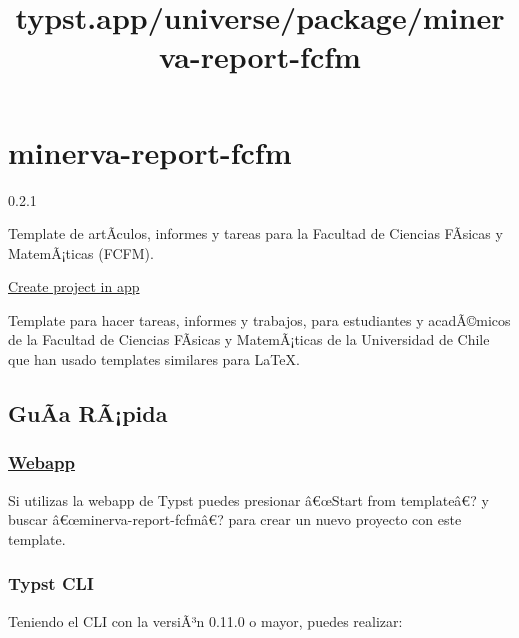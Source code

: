 \title{typst.app/universe/package/minerva-report-fcfm}

\label{banner}
\label{template-thumbnail}

\section{minerva-report-fcfm}\label{minerva-report-fcfm}

{ 0.2.1 }

Template de artÃ­culos, informes y tareas para la Facultad de Ciencias
FÃ­sicas y MatemÃ¡ticas (FCFM).

\href{/app?template=minerva-report-fcfm&version=0.2.1}{Create project in
app}

\label{readme}
Template para hacer tareas, informes y trabajos, para estudiantes y
acadÃ©micos de la Facultad de Ciencias FÃ­sicas y MatemÃ¡ticas de la
Universidad de Chile que han usado templates similares para LaTeX.

\subsection{GuÃ­a RÃ¡pida}\label{guuxe3a-ruxe3pida}

\subsubsection{\texorpdfstring{\href{https://typst.app/}{Webapp}}{Webapp}}\label{webapp}

Si utilizas la webapp de Typst puedes presionar â€œStart from
templateâ€? y buscar â€œminerva-report-fcfmâ€? para crear un nuevo
proyecto con este template.

\subsubsection{Typst CLI}\label{typst-cli}

Teniendo el CLI con la versiÃ³n 0.11.0 o mayor, puedes realizar:

\begin{Shaded}
\begin{Highlighting}[]
\end{Highlighting}
\end{Shaded}

